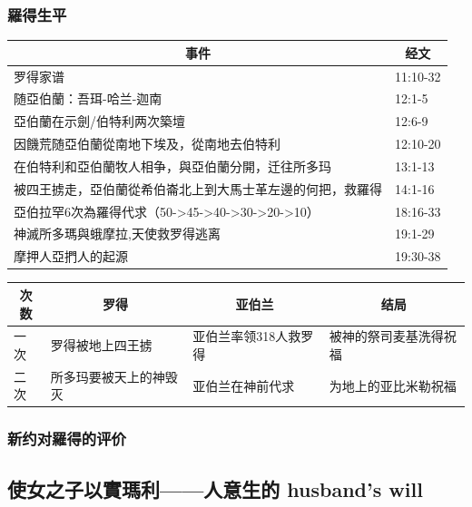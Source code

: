 \subsubsection{羅得生平}
\begin{table}[H]
\centering
\begin{tabular}{p{14cm}|p{2.350cm}}\hline\hline
\multicolumn{1}{c|}{事件}&\multicolumn{1}{c}{经文}\\\hline

罗得家谱&11:10-32\\\hline
随亞伯蘭：吾珥-哈兰-迦南&12:1-5\\\hline
亞伯蘭在示劍/伯特利两次築壇&12:6-9\\\hline
因饑荒随亞伯蘭從南地下埃及，從南地去伯特利&12:10-20\\\hline
在伯特利和亞伯蘭牧人相争，與亞伯蘭分開，迁往所多玛&13:1-13\\\hline
被四王掳走，亞伯蘭從希伯崙北上到大馬士革左邊的何把，救羅得&14:1-16\\\hline
亞伯拉罕6次為羅得代求（50->45->40->30->20->10）&18:16-33\\\hline
神滅所多瑪與蛾摩拉,天使救罗得逃离&19:1-29\\\hline
摩押人亞捫人的起源&19:30-38\\\hline
\end{tabular}
\end{table}

\begin{table}[H]
\centering
\begin{tabular}{p{}|p{4.25cm}|p{4.25cm}|p{4.25cm}}\hline\hline
\multicolumn{1}{c|}{次数}&\multicolumn{1}{c|}{罗得}&\multicolumn{1}{c|}{亚伯兰}&\multicolumn{1}{c}{结局}\\\hline
一次&罗得被地上四王掳&亚伯兰率领318人救罗得&被神的祭司麦基洗得祝福\\\hline
二次&所多玛要被天上的神毁灭&亚伯兰在神前代求&为地上的亚比米勒祝福\\\hline
\end{tabular}
\end{table}



\subsubsection{新约对羅得的评价}

\subsection{使女之子以實瑪利——人意生的 husband's will}
